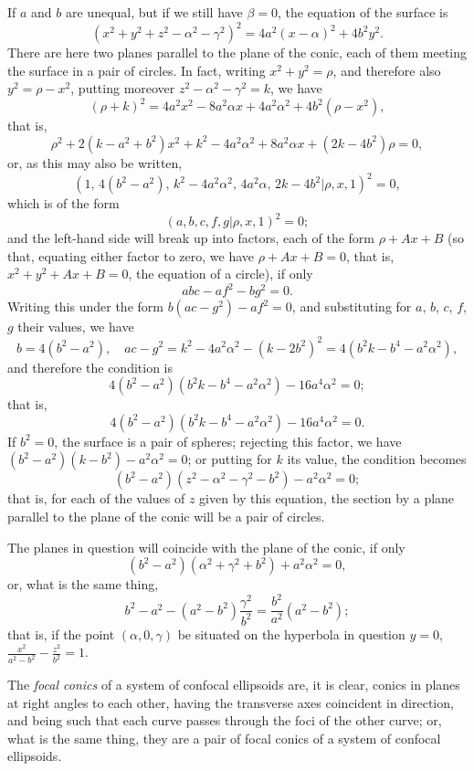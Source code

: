 \documentclass[11pt,a4paper]{article}
\theoremstyle{plain}
\begin{document}
If $a$ and $b$ are unequal, but if we still have $\beta = 0$, the equation of the surface is
\[
(x^2 + y^2 + z^2 - \alpha^2 - \gamma^2)^2 = 4a^2(x - \alpha)^2 + 4b^2y^2.
\]
There are here two planes parallel to the plane of the conic, each of them meeting the surface in a pair of circles. In fact, writing $x^2 + y^2 = \rho$, and therefore also $y^2 = \rho - x^2$, putting moreover $z^2 - \alpha^2 - \gamma^2 = k$, we have
\[
(\rho + k)^2 = 4a^2x^2 - 8a^2\alpha x + 4a^2\alpha^2 + 4b^2(\rho - x^2),
\]
that is,
\[
\rho^2 + 2(k - a^2 + b^2)x^2 + k^2 - 4a^2\alpha^2 + 8a^2\alpha x + (2k - 4b^2)\rho = 0,
\]
or, as this may also be written,
\[
(1, \, 4(b^2 - a^2), \, k^2 - 4a^2\alpha^2, \, 4a^2\alpha, \, 2k - 4b^2  |  \rho, x, 1)^2 = 0,
\]
which is of the form
\[
(a, b, c, f, g  |  \rho, x, 1)^2 = 0;
\]
and the left-hand side will break up into factors, each of the form $\rho + Ax + B$ (so that, equating either factor to zero, we have $\rho + Ax + B = 0$, that is, $x^2 + y^2 + Ax + B = 0$, the equation of a circle), if only
\[
abc - af^2 - bg^2 = 0.
\]
Writing this under the form $b(ac - g^2) - af^2 = 0$, and substituting for $a$, $b$, $c$, $f$, $g$ their values, we have
\[
b = 4(b^2 - a^2), \quad ac - g^2 = k^2 - 4a^2\alpha^2 - (k - 2b^2)^2 = 4(b^2k - b^4 - a^2\alpha^2),
\]
and therefore the condition is
\[
4(b^2 - a^2)(b^2k - b^4 - a^2\alpha^2) - 16a^4\alpha^2 = 0;
\]
that is,
\[
4(b^2 - a^2)(b^2k - b^4 - a^2\alpha^2) - 16a^4\alpha^2 = 0.
\]
If $b^2 = 0$, the surface is a pair of spheres; rejecting this factor, we have $(b^2 - a^2)(k - b^2) - a^2\alpha^2 = 0$; or putting for $k$ its value, the condition becomes
\[
(b^2 - a^2)(z^2 - \alpha^2 - \gamma^2 - b^2) - a^2\alpha^2 = 0;
\]
that is, for each of the values of $z$ given by this equation, the section by a plane parallel to the plane of the conic will be a pair of circles.

The planes in question will coincide with the plane of the conic, if only
\[
(b^2 - a^2)(\alpha^2 + \gamma^2 + b^2) + a^2\alpha^2 = 0,
\]
or, what is the same thing,
\[
b^2 - a^2 - (a^2 - b^2)\frac{\gamma^2}{b^2} = \frac{b^2}{a^2}(a^2 - b^2);
\]
that is, if the point $(\alpha, 0, \gamma)$ be situated on the hyperbola in question $y = 0$, $\frac{x^2}{a^2 - b^2} - \frac{z^2}{b^2} = 1$.

The \textit{focal conics} of a system of confocal ellipsoids are, it is clear, conics in planes at right angles to each other, having the transverse axes coincident in direction, and being such that each curve passes through the foci of the other curve; or, what is the same thing, they are a pair of focal conics of a system of confocal ellipsoids.
\end{document}
